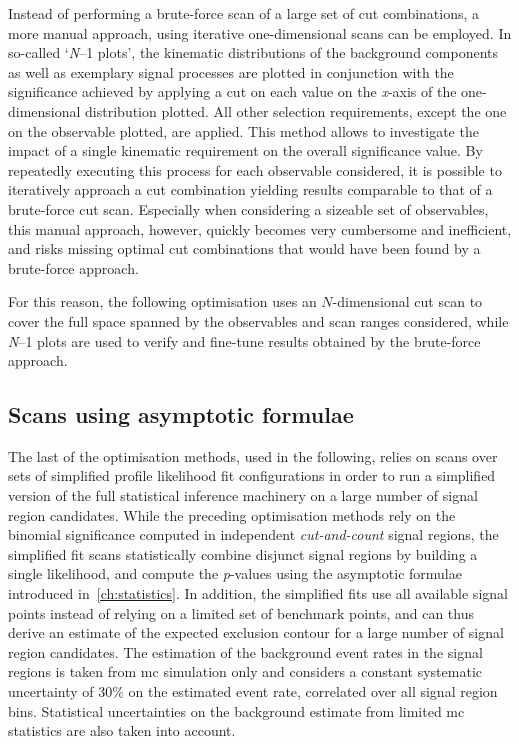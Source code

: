 Instead of performing a brute-force scan of a large set of cut combinations, a more manual approach, using iterative one-dimensional scans can be employed. In so-called `\textit{N}--1 plots', the kinematic distributions of the background components as well as exemplary signal processes are plotted in conjunction with the significance achieved by applying a cut on each value on the \textit{x}-axis of the one-dimensional distribution plotted. All other selection requirements, except the one on the observable plotted, are applied. This method allows to investigate the impact of a single kinematic requirement on the overall significance value. By repeatedly executing this process for each observable considered, it is possible to iteratively approach a cut combination yielding results comparable to that of a brute-force cut scan. Especially when considering a sizeable set of observables, this manual approach, however, quickly becomes very cumbersome and inefficient, and risks missing optimal cut combinations that would have been found by a brute-force approach.

For this reason, the following optimisation uses an $N$-dimensional cut scan to cover the full space spanned by the observables and scan ranges considered, while \textit{N}--1 plots are used to verify and fine-tune results obtained by the brute-force approach.

\subsection{Scans using asymptotic formulae}\label{sec:fit-scan}

The last of the optimisation methods, used in the following, relies on scans over sets of simplified profile likelihood fit configurations in order to run a simplified version of the full statistical inference machinery on a large number of signal region candidates.
While the preceding optimisation methods rely on the binomial significance computed in independent \textit{cut-and-count} signal regions, the simplified fit scans statistically combine disjunct signal regions by building a single likelihood, and compute the \textit{p}-values using the asymptotic formulae introduced in~\cref{ch:statistics}.
In addition, the simplified fits use all available signal points instead of relying on a limited set of benchmark points, and can thus derive an estimate of the expected exclusion contour for a large number of signal region candidates.
The estimation of the background event rates in the signal regions is taken from \gls{mc} simulation only and considers a constant systematic uncertainty of 30\% on the estimated event rate, correlated over all signal region bins. Statistical uncertainties on the background estimate from limited \gls{mc} statistics are also taken into account. 

